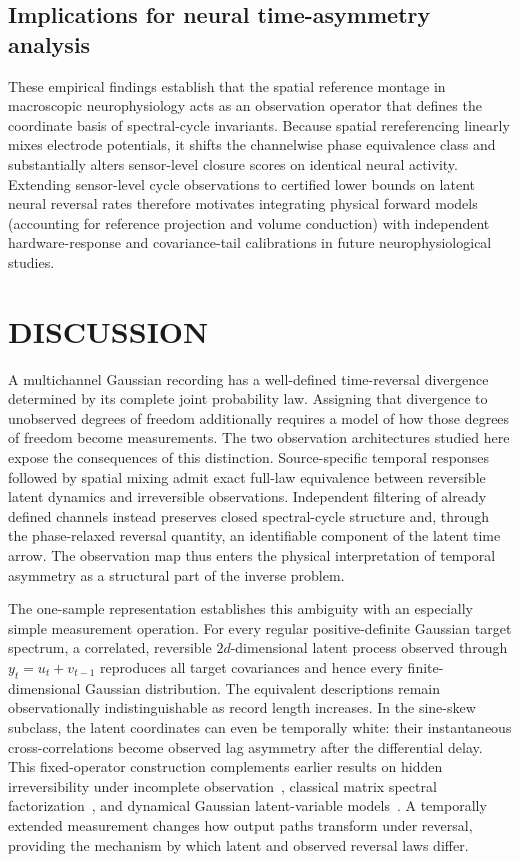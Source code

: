 \documentclass[aps,pre,reprint,amsmath,amssymb,superscriptaddress]{revtex4-2}
\begin{document}
\subsection{Implications for neural time-asymmetry analysis}

These empirical findings establish that the spatial reference montage in macroscopic neurophysiology acts as an observation operator that defines the coordinate basis of spectral-cycle invariants. Because spatial rereferencing linearly mixes electrode potentials, it shifts the channelwise phase equivalence class and substantially alters sensor-level closure scores on identical neural activity. Extending sensor-level cycle observations to certified lower bounds on latent neural reversal rates therefore motivates integrating physical forward models (accounting for reference projection and volume conduction) with independent hardware-response and covariance-tail calibrations in future neurophysiological studies.

\section{DISCUSSION}

A multichannel Gaussian recording has a well-defined time-reversal divergence determined by its complete joint probability law. Assigning that divergence to unobserved degrees of freedom additionally requires a model of how those degrees of freedom become measurements. The two observation architectures studied here expose the consequences of this distinction. Source-specific temporal responses followed by spatial mixing admit exact full-law equivalence between reversible latent dynamics and irreversible observations. Independent filtering of already defined channels instead preserves closed spectral-cycle structure and, through the phase-relaxed reversal quantity, an identifiable component of the latent time arrow. The observation map thus enters the physical interpretation of temporal asymmetry as a structural part of the inverse problem.

The one-sample representation establishes this ambiguity with an especially simple measurement operation. For every regular positive-definite Gaussian target spectrum, a correlated, reversible $2d$-dimensional latent process observed through $y_t=u_t+v_{t-1}$ reproduces all target covariances and hence every finite-dimensional Gaussian distribution. The equivalent descriptions remain observationally indistinguishable as record length increases. In the sine-skew subclass, the latent coordinates can even be temporally white: their instantaneous cross-correlations become observed lag asymmetry after the differential delay. This fixed-operator construction complements earlier results on hidden irreversibility under incomplete observation~\cite{lucente2022}, classical matrix spectral factorization~\cite{ephremidze2007,ephremidze2014}, and dynamical Gaussian latent-variable models~\cite{gokcen2015,rutten2020}. A temporally extended measurement changes how output paths transform under reversal, providing the mechanism by which latent and observed reversal laws differ.
\end{document}
